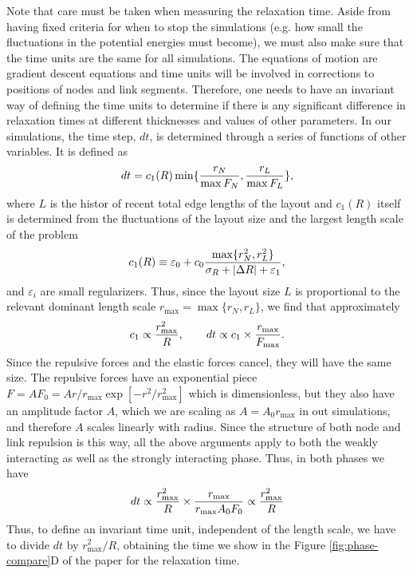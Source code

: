 \documentclass[endfloats,nofootinbib,preprint,floatfix,titlepage,superscriptaddress]{revtex4} %
\begin{document}
Note that care must be taken when measuring the relaxation time. 
Aside from having fixed criteria for when to stop the simulations (e.g. how small the fluctuations in the potential energies must become), we must also make sure that the time units are the same for all simulations. 
The equations of motion are gradient descent equations and time units will be involved in corrections to positions of nodes and link segments. 
Therefore, one needs to have an invariant way of defining the time units to determine if there is any significant difference in relaxation times at different thicknesses and values of other parameters. 
In our simulations, the time step, $dt$, is determined through a series of functions of other variables. 
It is defined as 
$$dt = c_1( R) \min\{{r_N\over \max{F_N}},{r_L\over \max{F_L}}\}, $$
where $L$ is the histor of recent total edge lengths of the layout and  $c_1(R)$ itself is determined from the fluctuations of the layout size and the largest length scale of the problem
$$ c_1(R) \equiv \varepsilon_0 + c_0 {\max\{r_N^2, r_L^2\}\over \sigma_R + |\Delta R|+\varepsilon_1},$$
and $\varepsilon_i$ are small regularizers. 
Thus, since the layout size $L$ is proportional to the relevant dominant length scale $r_{\max} = \max{\{r_N, r_L\}} $, we find that approximately
\[ c_1 \propto {r_{\max}^2\over R}, \qquad dt \propto c_1 \times {r_{\max} \over F_{\max}}. \]
Since the repulsive forces and the elastic forces cancel, they will have the same size. The repulsive forces have an exponential piece $ F = A F_0 = A r/r_{\max} \exp[-r^2/r^2_{\max}] $ which is dimensionless, but they also have an amplitude factor $A$, which we are scaling as $A = A_0 r_{\max}$ in out simulations, and therefore $A$ scales linearly with radius. 
Since the structure of both node and link repulsion is this way, all the above arguments apply to both the weakly interacting as well as the strongly interacting phase. %
Thus, in both phases we have
$$ dt \propto {r_{\max}^2\over R} \times {r_{\max} \over r_{\max} A_0 F_0 } \propto {r_{\max}^2\over R} $$
Thus, to define an invariant time unit, independent of the length scale, we have to divide $dt$ by $r_{\max}^2/ R$, obtaining the time we show in the Figure \ref{fig:phase-compare}D of the paper for the relaxation time. 
\end{document}
